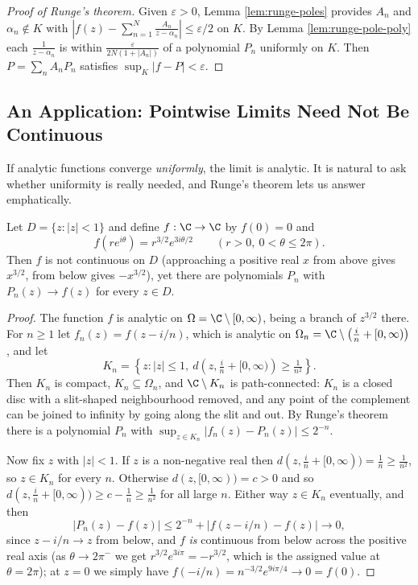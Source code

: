 \begin{proof}[Proof of Runge's theorem]
	Given $\varepsilon>0$, Lemma \ref{lem:runge-poles} provides $A_n$ and $\alpha_n\notin K$ with $\left|f(z)-\sum_{n=1}^N\frac{A_n}{z-\alpha_n}\right|\leq\varepsilon/2$ on $K$. By Lemma \ref{lem:runge-pole-poly} each $\frac{1}{z-\alpha_n}$ is within $\frac{\varepsilon}{2N(1+|A_n|)}$ of a polynomial $P_n$ uniformly on $K$. Then $P = \sum_n A_nP_n$ satisfies $\sup_K|f-P|<\varepsilon$.
\end{proof}

\subsection{An Application: Pointwise Limits Need Not Be Continuous}

If analytic functions converge \emph{uniformly}, the limit is analytic. It is natural to ask whether uniformity is really needed, and Runge's theorem lets us answer emphatically.

\begin{example}\label{ex:runge-pointwise}
	Let $D = \{z:|z|<1\}$ and define $f : \C\to\C$ by $f(0)=0$ and
	$$f(re^{i\theta}) = r^{3/2}e^{3i\theta/2}\qquad (r>0,\ 0<\theta\leq2\pi).$$
	Then $f$ is not continuous on $D$ (approaching a positive real $x$ from above gives $x^{3/2}$, from below gives $-x^{3/2}$), yet there are polynomials $P_n$ with $P_n(z)\to f(z)$ for every $z\in D$.
\end{example}

\begin{proof}
	The function $f$ is analytic on $\Omega = \C\setminus[0,\infty)$, being a branch of $z^{3/2}$ there. For $n\geq1$ let $f_n(z) = f(z-i/n)$, which is analytic on $\Omega_n = \C\setminus\left(\tfrac in + [0,\infty)\right)$, and let
	$$K_n = \left\{z : |z|\leq 1,\ d\left(z,\tfrac in+[0,\infty)\right)\geq \tfrac{1}{n^2}\right\}.$$
	Then $K_n$ is compact, $K_n\subseteq\Omega_n$, and $\C\setminus K_n$ is path-connected: $K_n$ is a closed disc with a slit-shaped neighbourhood removed, and any point of the complement can be joined to infinity by going along the slit and out. By Runge's theorem there is a polynomial $P_n$ with $\sup_{z\in K_n}|f_n(z)-P_n(z)|\leq2^{-n}$.

	Now fix $z$ with $|z|<1$. If $z$ is a non-negative real then $d(z,\tfrac in+[0,\infty)) = \tfrac1n\geq\tfrac1{n^2}$, so $z\in K_n$ for every $n$. Otherwise $d(z,[0,\infty)) = c > 0$ and so $d(z,\tfrac in +[0,\infty))\geq c - \tfrac1n \geq \tfrac{1}{n^2}$ for all large $n$. Either way $z\in K_n$ eventually, and then
	$$|P_n(z)-f(z)| \leq 2^{-n} + |f(z - i/n)-f(z)| \to 0,$$
	since $z-i/n\to z$ from below, and $f$ \emph{is} continuous from below across the positive real axis (as $\theta\to2\pi^-$ we get $r^{3/2}e^{3i\pi} = -r^{3/2}$, which is the assigned value at $\theta = 2\pi$); at $z=0$ we simply have $f(-i/n) = n^{-3/2}e^{9i\pi/4}\to0=f(0)$.
\end{proof}

